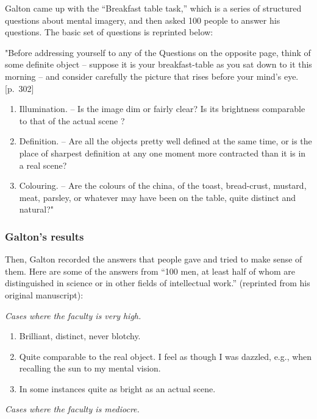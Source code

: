 \documentclass[
  oneside,
  12pt]{crumpbook}
\providecommand{\tightlist}{%
  \setlength{\itemsep}{0pt}\setlength{\parskip}{0pt}}
\begin{document}
Galton came up with the ``Breakfast table task,'' which is a series of structured questions about mental imagery, and then asked 100 people to answer his questions. The basic set of questions is reprinted below:

"Before addressing yourself to any of the Questions on the opposite page, think of some definite object -- suppose it is your breakfast-table as you sat down to it this morning -- and consider carefully the picture that rises before your mind's eye. {[}p.~302{]}

\begin{enumerate}
\def\labelenumi{\arabic{enumi}.}
\tightlist
\item
  Illumination. -- Is the image dim or fairly clear? Is its brightness comparable to that of the actual scene ?
\item
  Definition. -- Are all the objects pretty well defined at the same time, or is the place of sharpest definition at any one moment more contracted than it is in a real scene?
\item
  Colouring. -- Are the colours of the china, of the toast, bread-crust, mustard, meat, parsley, or whatever may have been on the table, quite distinct and natural?"
\end{enumerate}

\hypertarget{galtons-results}{%
\subsubsection{Galton's results}\label{galtons-results}}

Then, Galton recorded the answers that people gave and tried to make sense of them. Here are some of the answers from ``100 men, at least half of whom are distinguished in science or in other fields of intellectual work.'' (reprinted from his original manuscript):

\emph{Cases where the faculty is very high.}

\begin{enumerate}
\def\labelenumi{\arabic{enumi}.}
\item
  Brilliant, distinct, never blotchy.
\item
  Quite comparable to the real object. I feel as though I was dazzled, e.g., when recalling the sun to my mental vision.
\item
  In some instances quite as bright as an actual scene.
\end{enumerate}

\emph{Cases where the faculty is mediocre.}
\end{document}
